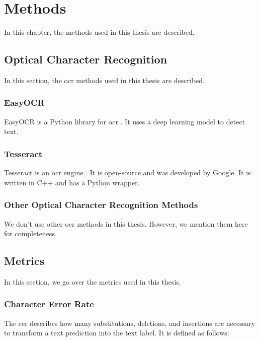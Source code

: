 \chapter{Methods}
\label{chap:methods}

In this chapter, the methods used in this thesis are described.

\section{Optical Character Recognition}
\label{sec:ocr}

In this section, the \gls{ocr} methods used in this thesis are described.

\subsection{EasyOCR}
\label{subsec:easyocr}

EasyOCR is a Python library for \gls{ocr} \cite{easyocr_2020}. It uses a deep learning model to detect text.

\subsection{Tesseract}
\label{subsec:tesseract}

Tesseract is an \gls{ocr} engine \cite{tesseract_2007}. It is open-source and was developed by Google. It is written in C++ and has a Python wrapper.

\subsection{Other Optical Character Recognition Methods}
\label{subsec:other_ocr_methods}

We don't use other \gls{ocr} methods in this thesis.
However, we mention them here for completeness.


\section{Metrics}
\label{sec:metrics}

In this section, we go over the metrics used in this thesis.

\subsection{Character Error Rate}
\label{subsec:cer}

The \gls{cer} describes how many substitutions, deletions, and insertions are necessary to transform a text prediction into the text label.
It is defined as follows:

